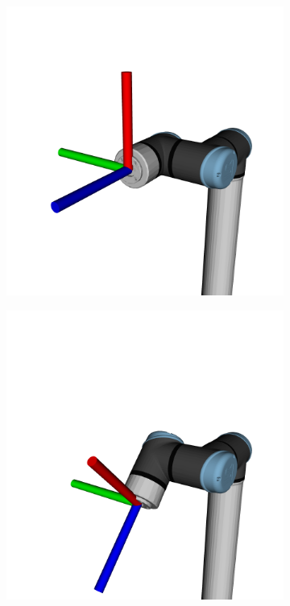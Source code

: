 \begin{figure}[h]
\begin{subfigure}{.2\linewidth}
      \label{fig:eef_p2}
    \end{subfigure}%
    \begin{subfigure}{.2\linewidth}
        \centering
        \includegraphics[width=\linewidth]{figs/chp3/P3.png}
        \label{fig:eef_p3}
    \end{subfigure}%
    \begin{subfigure}{.2\linewidth}
        \centering
        \includegraphics[width=\linewidth]{figs/chp3/P4.png}

\end{subfigure}
\end{figure}
